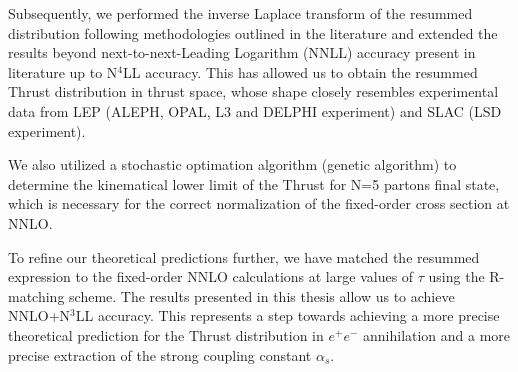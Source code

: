 \documentclass[10pt,english,openany]{book}
\begin{document}
Subsequently, we performed the inverse Laplace transform of the resummed distribution following methodologies outlined in the literature 
and extended the results beyond next-to-next-Leading Logarithm (NNLL) accuracy present in literature up to N$^4$LL accuracy. This has allowed us to obtain the resummed Thrust distribution in thrust space, whose shape 
closely resembles experimental data from LEP (ALEPH, OPAL, L3 and DELPHI experiment) and SLAC (LSD experiment).

We also utilized a stochastic optimation algorithm (genetic algorithm) to determine the kinematical lower limit of the Thrust
for N=5 partons final state, which is necessary for the correct normalization of the fixed-order cross section at NNLO.

To refine our theoretical predictions further, we have matched the resummed expression to the fixed-order NNLO calculations at large values of $\tau$ using the R-matching scheme.
The results presented in this thesis allow us to achieve NNLO+N$^3$LL accuracy.
This represents a step towards achieving a more precise theoretical prediction for the Thrust distribution in $e^+e^-$ annihilation and
a more precise extraction of the strong coupling constant $\alpha_s$.
\end{document}
